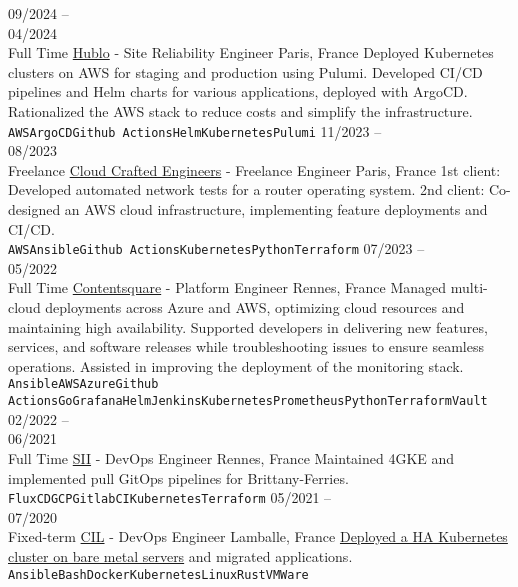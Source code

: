 \documentclass[10pt]{developercv}
\begin{document}
\begin{entrylist}
	\entry
		{09/2024 --\\04/2024\\\footnotesize{Full Time}}
		{\href{https://www.hublo.com/}{Hublo} - Site Reliability Engineer}
		{Paris, France}
		{Deployed Kubernetes clusters on AWS for staging and production using Pulumi.
		Developed CI/CD pipelines and Helm charts for various applications, deployed with ArgoCD.
		Rationalized the AWS stack to reduce costs and simplify the infrastructure.\\
		\texttt{AWS}\slashsep\texttt{ArgoCD}\slashsep\texttt{Github Actions}\slashsep\texttt{Helm}\slashsep\texttt{Kubernetes}\slashsep\texttt{Pulumi}}
	\entry
		{11/2023 --\\08/2023\\\footnotesize{Freelance}}
		{\href{https://craftedengineers.cloud/}{Cloud Crafted Engineers} - Freelance Engineer}
		{Paris, France}
		{1st client: Developed automated network tests for a router operating system.
		2nd client: Co-designed an AWS cloud infrastructure, implementing feature deployments and CI/CD.\\
		\texttt{AWS}\slashsep\texttt{Ansible}\slashsep\texttt{Github Actions}\slashsep\texttt{Kubernetes}\slashsep\texttt{Python}\slashsep\texttt{Terraform}}
	\entry
		{07/2023 --\\05/2022\\\footnotesize{Full Time}}
		{\href{https://contentsquare.com/}{Contentsquare} - Platform Engineer}
		{Rennes, France}
		{Managed multi-cloud deployments across Azure and AWS, optimizing cloud resources and maintaining high availability.
		Supported developers in delivering new features, services, and software releases while troubleshooting issues to ensure seamless operations.
		Assisted in improving the deployment of the monitoring stack.\\
		\texttt{Ansible}\slashsep\texttt{AWS}\slashsep\texttt{Azure}\slashsep\texttt{Github Actions}\slashsep\texttt{Go}\slashsep\texttt{Grafana}\slashsep\texttt{Helm}\slashsep\texttt{Jenkins}\slashsep\texttt{Kubernetes}\slashsep\texttt{Prometheus}\slashsep\texttt{Python}\slashsep\texttt{Terraform}\slashsep\texttt{Vault}}
	\entry
		{02/2022 --\\06/2021\\\footnotesize{Full Time}}
		{\href{https://sii-group.com/}{SII} - DevOps Engineer}
		{Rennes, France}
		{Maintained 4GKE and implemented pull GitOps pipelines for Brittany-Ferries.\\
		\texttt{FluxCD}\slashsep\texttt{GCP}\slashsep\texttt{GitlabCI}\slashsep\texttt{Kubernetes}\slashsep\texttt{Terraform}}
	\entry
		{05/2021 --\\07/2020\\\footnotesize{Fixed-term}}
		{\href{https://www.cil-lamballe.com/}{CIL} - DevOps Engineer}
		{Lamballe, France}
		{\href{https://github.com/Ant0wan/VMWare-Kubenetes-cluster}{Deployed a HA Kubernetes cluster on bare metal servers} and migrated applications.\\
		\texttt{Ansible}\slashsep\texttt{Bash}\slashsep\texttt{Docker}\slashsep\texttt{Kubernetes}\slashsep\texttt{Linux}\slashsep\texttt{Rust}\slashsep\texttt{VMWare}}
\end{entrylist}
\end{document}
